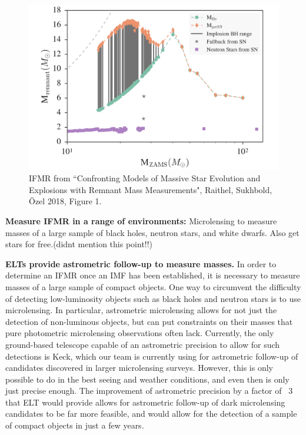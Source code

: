 \documentclass[11pt]{article}
\begin{document}
\begin{figure}
    \centering
    \includegraphics[scale=0.4]{IFMR_raithel.png}
    \caption{IFMR from ``Confronting Models of Massive Star Evolution and Explosions with Remnant Mass Measurements", Raithel, Sukhbold, \"{O}zel 2018, Figure 1.}
\end{figure}

\textbf{Measure IFMR in a range of environments:}
Microlensing to measure masses of a large sample of black holes, neutron stars, and white dwarfs.
Also get stars for free.(didnt mention this point!!)

\textbf{ELTs provide astrometric follow-up to measure masses.}
In order to determine an IFMR once an IMF has been established, it is necessary to measure masses of a large sample of compact objects. One way to circumvent the difficulty of detecting low-luminosity objects such as black holes and neutron stars is to use microlensing. In particular, astrometric microlensing allows for not just the detection of non-luminous objects, but can put constraints on their masses that pure photometric microlensing observations often lack. Currently, the only ground-based telescope capable of an astrometric precision to allow for such detections is Keck, which our team is currently using for astrometric follow-up of candidates discovered in larger microlensing surveys. However, this is only possible to do in the best seeing and weather conditions, and even then is only just precise enough.  The improvement of astrometric precision by a factor of ~3 that ELT would provide allows for astrometric follow-up of dark microlensing candidates to be far more feasible, and would allow for the detection of a sample of compact objects in just a few years.
\end{document}
